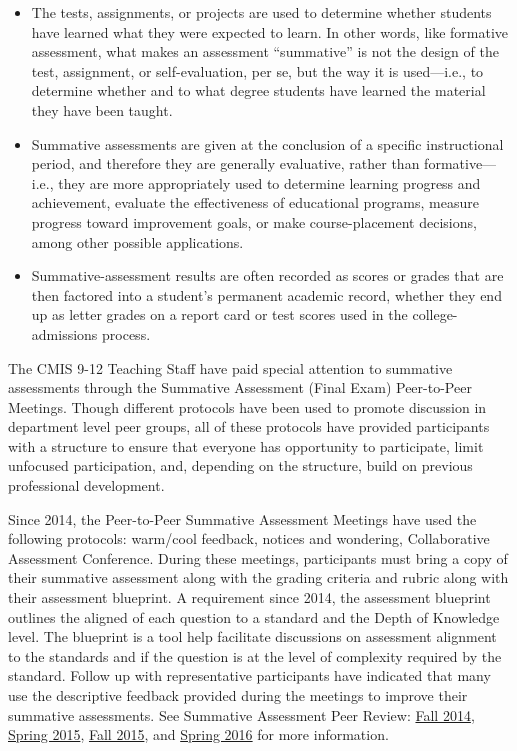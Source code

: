 \begin{findings}
\begin{itemize}
\item The tests, assignments, or projects are used to determine whether students have learned what they were expected to learn. In other words, like formative assessment, what makes an assessment “summative” is not the design of the test, assignment, or self-evaluation, per se, but the way it is used—i.e., to determine whether and to what degree students have learned the material they have been taught.
\item Summative assessments are given at the conclusion of a specific instructional period, and therefore they are generally evaluative, rather than formative—i.e., they are more appropriately used to determine learning progress and achievement, evaluate the effectiveness of educational programs, measure progress toward improvement goals, or make course-placement decisions, among other possible applications.
\item Summative-assessment results are often recorded as scores or grades that are then factored into a student’s permanent academic record, whether they end up as letter grades on a report card or test scores used in the college-admissions process. 
\end{itemize}

The CMIS 9-12 Teaching Staff have paid special attention to summative assessments through the Summative Assessment (Final Exam) Peer-to-Peer Meetings. Though different protocols have been used to promote discussion in department level peer groups, all of these protocols have provided participants with a structure to ensure that everyone has opportunity to participate, limit unfocused participation, and, depending on the structure, build on previous professional development. 

Since 2014, the Peer-to-Peer Summative Assessment Meetings have used the following protocols:  warm/cool feedback, notices and wondering, Collaborative Assessment Conference. During these meetings, participants must bring a copy of their summative assessment along with the grading criteria and rubric along with their assessment blueprint. A requirement since 2014, the assessment blueprint outlines the aligned of each question to a standard and the Depth of Knowledge level. The blueprint is a tool help facilitate discussions on assessment alignment to the standards and if the question is at the level of complexity required by the standard.  Follow up with representative participants have indicated that many use the descriptive feedback provided during the meetings to improve their summative assessments. See Summative Assessment Peer Review: \href{https://drive.google.com/a/cmis.ac.th/folderview?id=0ByVFfrm0zfolTHY0dmtURG5pcGs&usp=sharing}{Fall 2014}, \href{https://drive.google.com/a/cmis.ac.th/folderview?id=0ByVFfrm0zfolaWQzeWxCTlVyUFU&usp=sharing}{Spring 2015}, \href{https://drive.google.com/a/cmis.ac.th/folderview?id=0ByVFfrm0zfolRjQzTDhmT0dyYzg&usp=sharing}{Fall 2015}, and \href{https://drive.google.com/a/cmis.ac.th/folderview?id=0ByVFfrm0zfolT29vQXpQeXp3VlU&usp=sharing}{Spring 2016} for more information. 


\end{findings}
